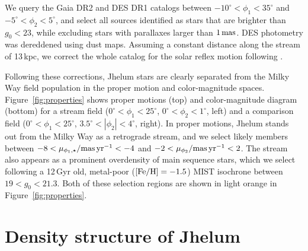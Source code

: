 \documentclass[twocolumn]{aastex62}
\begin{document}
We query the Gaia DR2 \citep{gdr2} and DES DR1 \citep{abbott2018} catalogs between $-10^\circ<\phi_1<35^\circ$ and $-5^\circ<\phi_2<5^\circ$, and select all sources identified as stars that are brighter than $g_0<23$, while excluding stars with parallaxes larger than $1\,\rm mas$.
DES photometry was dereddened using \citet{sfd} dust maps.
Assuming a constant distance along the stream of 13\,kpc, we correct the whole catalog for the solar reflex motion following \citet{pwb}.

Following these corrections, Jhelum stars are clearly separated from the Milky Way field population in the proper motion and color-magnitude spaces.
Figure~\ref{fig:properties} shows proper motions (top) and color-magnitude diagram (bottom) for a stream field ($0^\circ<\phi_1<25^\circ$, $0^\circ<\phi_2<1^\circ$, left) and a comparison field ($0^\circ<\phi_1<25^\circ$, $3.5^\circ<|\phi_2|<4^\circ$, right).
In proper motions, Jhelum stands out from the Milky Way as a retrograde stream, and we select likely members between $-8<\mu_{\phi_1,\star}/{\rm mas\,yr^{-1}}<-4$ and $-2<\mu_{\phi_2}/{\rm mas\,yr^{-1}}<2$.
The stream also appears as a prominent overdensity of main sequence stars, which we select following a 12\,Gyr old, metal-poor ($\rm[Fe/H]=-1.5$) MIST isochrone \citep{choi2016} between $19<g_0<21.3$.
Both of these selection regions are shown in light orange in Figure~\ref{fig:properties}.


\section{Density structure of Jhelum}
\label{sec:structure}
\end{document}
